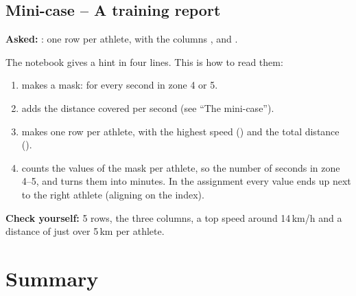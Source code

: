 \documentclass[11pt,a4paper]{article}
\begin{document}
\subsection*{Mini-case -- A training report}

\textbf{Asked:} : one row per athlete, with the
columns ,  and
.

The notebook gives a hint in four lines. This is how to read them:

\begin{enumerate}
  \item {} makes a
        mask:  for every second in zone 4 or 5.
  \item {}
        adds the distance covered per second (see ``The mini-case'').
  \item {} makes one row per athlete,
        with the highest speed () and the total distance
        ().
  \item {}
        counts the  values of the mask per athlete, so the
        number of seconds in zone 4--5, and turns them into minutes. In the
        assignment every value ends up next to the right athlete (aligning
        on the index).
\end{enumerate}

\textbf{Check yourself:} 5 rows, the three columns, a top speed around
14\,km/h and a distance of just over 5\,km per athlete.

\section{Summary}
\end{document}
